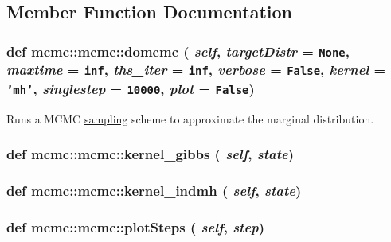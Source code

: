 \subsection{Member Function Documentation}
\hypertarget{classmcmc_1_1mcmc_0a65f27f35aa71a335bc5e5b633b5242}{
\subsubsection[{domcmc}]{\setlength{\rightskip}{0pt plus 5cm}def mcmc::mcmc::domcmc ( {\em self}, \/   {\em targetDistr} = {\tt None}, \/   {\em maxtime} = {\tt inf}, \/   {\em ths\_\-iter} = {\tt inf}, \/   {\em verbose} = {\tt False}, \/   {\em kernel} = {\tt 'mh'}, \/   {\em singlestep} = {\tt 10000}, \/   {\em plot} = {\tt False})}}
\label{classmcmc_1_1mcmc_0a65f27f35aa71a335bc5e5b633b5242}


Runs a MCMC \hyperlink{namespacesampling}{sampling} scheme to approximate the marginal distribution. 

\hypertarget{classmcmc_1_1mcmc_54669cdc319c8ef04f8030a1b2b3664e}{
\subsubsection[{kernel\_\-gibbs}]{\setlength{\rightskip}{0pt plus 5cm}def mcmc::mcmc::kernel\_\-gibbs ( {\em self}, \/   {\em state})}}
\label{classmcmc_1_1mcmc_54669cdc319c8ef04f8030a1b2b3664e}


\hypertarget{classmcmc_1_1mcmc_d42bf6f27a081b18507d87576cfa00e7}{
\subsubsection[{kernel\_\-indmh}]{\setlength{\rightskip}{0pt plus 5cm}def mcmc::mcmc::kernel\_\-indmh ( {\em self}, \/   {\em state})}}
\label{classmcmc_1_1mcmc_d42bf6f27a081b18507d87576cfa00e7}


\hypertarget{classmcmc_1_1mcmc_61ddda03459f328c4190dd15041909a9}{
\subsubsection[{plotSteps}]{\setlength{\rightskip}{0pt plus 5cm}def mcmc::mcmc::plotSteps ( {\em self}, \/   {\em step})}}
\label{classmcmc_1_1mcmc_61ddda03459f328c4190dd15041909a9}


